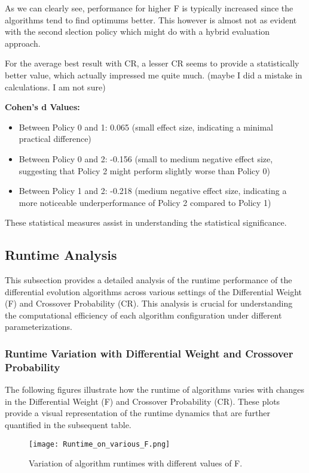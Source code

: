 \documentclass[12pt,a4paper]{article}
\begin{document}
As we can clearly see, performance for higher F is typically increased since the algorithms tend to find optimums better. This however is almost not as evident with the second slection policy which might do with a hybrid evaluation approach.

For the average best result with CR, a lesser CR seems to provide a statistically better value, which actually impressed me quite much. (maybe I did a mistake in calculations. I am not sure)

\textbf{Cohen's d Values:}
\begin{itemize}
    \item Between Policy 0 and 1: 0.065 (small effect size, indicating a minimal practical difference)
    \item Between Policy 0 and 2: -0.156 (small to medium negative effect size, suggesting that Policy 2 might perform slightly worse than Policy 0)
    \item Between Policy 1 and 2: -0.218 (medium negative effect size, indicating a more noticeable underperformance of Policy 2 compared to Policy 1)
\end{itemize}

These statistical measures assist in understanding the statistical significance.

\subsection{Runtime Analysis}
This subsection provides a detailed analysis of the runtime performance of the differential evolution algorithms across various settings of the Differential Weight (F) and Crossover Probability (CR). This analysis is crucial for understanding the computational efficiency of each algorithm configuration under different parameterizations.

\subsubsection{Runtime Variation with Differential Weight and Crossover Probability}
The following figures illustrate how the runtime of algorithms varies with changes in the Differential Weight (F) and Crossover Probability (CR). These plots provide a visual representation of the runtime dynamics that are further quantified in the subsequent table.

\begin{figure}[h]
    \centering
    \texttt{[image: Runtime\_on\_various\_F.png]}
    \caption{Variation of algorithm runtimes with different values of F.}
    \label{fig:runtime-f}
\end{figure}
\end{document}
